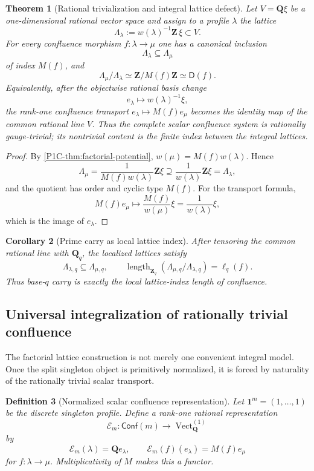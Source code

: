 \documentclass[11pt]{article}
\newtheorem{theorem}{Theorem}[section]
\newtheorem{corollary}[theorem]{Corollary}
\newtheorem{definition}[theorem]{Definition}
\theoremstyle{remark}
\newcommand{\Z}{\mathbf Z}
\providecommand{\Q}{\mathbf Q}
\begin{document}
\begin{theorem}[Rational trivialization and integral lattice defect]\label{P1C-thm:rational-lattice-trivialization}
Let $V=\Q\xi$ be a one-dimensional rational vector space and assign to a profile $\lambda$ the lattice
\[
 \boxed{
 \Lambda_\lambda:=w(\lambda)^{-1}\Z\,\xi\subset V.}
\]
For every confluence morphism $f:\lambda\to\mu$ one has a canonical inclusion
\[
 \Lambda_\lambda\subseteq\Lambda_\mu
\]
of index $M(f)$, and
\[
 \boxed{
 \Lambda_\mu/\Lambda_\lambda\simeq\Z/M(f)\Z\simeq\mathsf D(f).}
\]
Equivalently, after the objectwise rational basis change
\[
 e_\lambda\longmapsto w(\lambda)^{-1}\xi,
\]
the rank-one confluence transport $e_\lambda\mapsto M(f)e_\mu$ becomes the identity map of the
common rational line $V$.  Thus the complete scalar confluence system is rationally gauge-trivial;
its nontrivial content is the finite index between the integral lattices.
\end{theorem}

\begin{proof}
By \cref{P1C-thm:factorial-potential}, $w(\mu)=M(f)w(\lambda)$.  Hence
\[
 \Lambda_\mu
 =\frac1{M(f)w(\lambda)}\Z\xi
 \supseteq
 \frac1{w(\lambda)}\Z\xi
 =\Lambda_\lambda,
\]
and the quotient has order and cyclic type $M(f)$.  For the transport formula,
\[
 M(f)e_\mu\longmapsto
 \frac{M(f)}{w(\mu)}\xi
 =\frac1{w(\lambda)}\xi,
\]
which is the image of $e_\lambda$.
\end{proof}

\begin{corollary}[Prime carry as local lattice index]\label{P1C-cor:q-carry-lattice-index}
After tensoring the common rational line with $\Q_q$, the localized lattices satisfy
\[
 \Lambda_{\lambda,q}\subseteq\Lambda_{\mu,q},
 \qquad
 \boxed{
 \operatorname{length}_{\Z_q}
 (\Lambda_{\mu,q}/\Lambda_{\lambda,q})
 =\ell_q(f).}
\]
Thus base-$q$ carry is exactly the local lattice-index length of confluence.
\end{corollary}


\subsection{Universal integralization of rationally trivial confluence}

The factorial lattice construction is not merely one convenient integral model.  Once the split
singleton object is primitively normalized, it is forced by naturality of the rationally trivial scalar
transport.

\begin{definition}[Normalized scalar confluence representation]\label{P1C-def:scalar-confluence-representation}
Let $\mathbf1^m=(1,\ldots,1)$ be the discrete singleton profile.  Define a rank-one rational
representation
\[
 \mathscr E_m:\mathsf{Conf}(m)\longrightarrow \operatorname{Vect}^{(1)}_{\Q}
\]
by
\[
 \mathscr E_m(\lambda)=\Q e_\lambda,
 \qquad
 \mathscr E_m(f)(e_\lambda)=M(f)e_\mu
\]
for $f:\lambda\to\mu$.  Multiplicativity of $M$ makes this a functor.
\end{definition}
\end{document}
